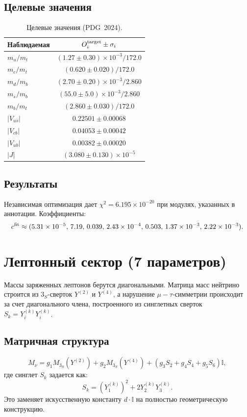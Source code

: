 \documentclass[12pt,a4paper]{article}
\numberwithin{equation}{section}
\begin{document}
\subsection{Целевые значения}
\begin{table}[H]
\centering
\caption{Целевые значения (PDG~2024).}
\begin{tabular}{lc}
\toprule
Наблюдаемая & $O_i^{\rm target} \pm \sigma_i$ \\
\midrule
$m_u/m_t$ & $(1.27 \pm 0.30)\times10^{-3}/172.0$ \\
$m_c/m_t$ & $(0.620 \pm 0.020)/172.0$ \\
$m_d/m_b$ & $(2.70 \pm 0.20)\times10^{-3}/2.860$ \\
$m_s/m_b$ & $(55.0 \pm 5.0)\times10^{-3}/2.860$ \\
$m_b/m_t$ & $(2.860 \pm 0.030)/172.0$ \\
$|V_{us}|$ & $0.22501 \pm 0.00068$ \\
$|V_{cb}|$ & $0.04053 \pm 0.00042$ \\
$|V_{ub}|$ & $0.00382 \pm 0.00020$ \\
$|J|$ & $(3.080 \pm 0.130)\times10^{-5}$ \\
\bottomrule
\end{tabular}
\end{table}

\subsection{Результаты}
Независимая оптимизация дает $\chi^2 = 6.195\times10^{-20}$ при модулях, указанных в аннотации.
Коэффициенты:
\begin{equation}
c^{\rm fit} \approx (5.31\times10^{-5},\,7.19,\,0.039,\,2.43\times10^{-4},\,0.503,\,1.37\times10^{-3},\,2.22\times10^{-3}).
\end{equation}

\section{Лептонный сектор (7 параметров)}
\label{sec:lepton}
Массы заряженных лептонов берутся диагональными. Матрица масс нейтрино строится из \(3_S\)-сверток \(Y^{(2)}\) и \(Y^{(4)}\), а нарушение \(\mu-\tau\)-симметрии происходит за счет диагонального члена, построенного из синглетных сверток \(S_k = Y_i^{(k)} Y_i^{(k)}\).

\subsection{Матричная структура}
\begin{equation}
M_\nu = g_1 M_{3_S}(Y^{(2)}) + g_2 M_{3_S}(Y^{(4)}) + \left( g_3 S_2 + g_4 S_4 + g_5 S_6 \right) \mathbb{I},
\end{equation}
где синглет \(S_k\) задается как:
\begin{equation}
S_k = (Y_1^{(k)})^2 + 2 Y_2^{(k)} Y_3^{(k)}.
\end{equation}
Это заменяет искусственную константу \(d \cdot \mathbb{I}\) на полностью геометрическую конструкцию.
\end{document}
